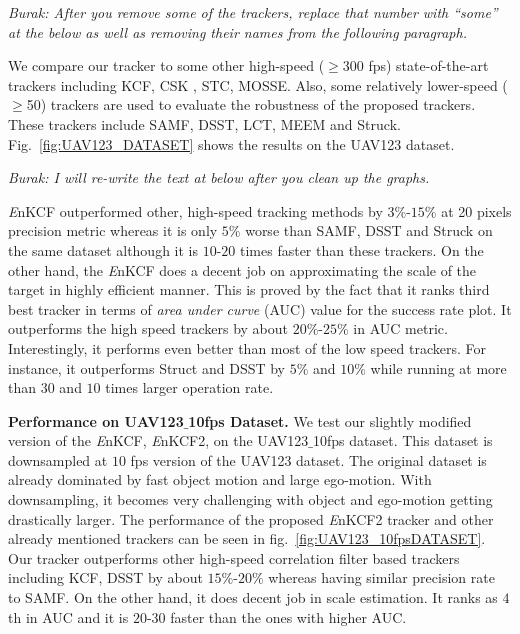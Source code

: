 \documentclass{bmvc2k}
\begin{document}
{\it Burak: After you remove some of the trackers, replace that number
  with ``some'' at the below as well as removing their names from the
  following paragraph.}

We compare our tracker to some other high-speed ($\geq$300 fps)
state-of-the-art trackers including KCF\cite{henriques2015high}, CSK
\cite{henriques2012exploiting}, STC\cite{zhang2014fast},
MOSSE\cite{bolme2010visual,henriques2015high}. Also, some relatively
lower-speed ($\geq$50) trackers are used to evaluate the robustness of
the proposed trackers. These trackers include SAMF\cite{li2014scale},
DSST\cite{danelljan2014accurate}, LCT\cite{ma2015long},
MEEM\cite{zhang2014meem} and Struck\cite{hare2012efficient}.
Fig.~\ref{fig:UAV123_DATASET} shows the results on the UAV123
dataset. 

{\it Burak: I will re-write the text at below after you clean up the graphs.}

{\it E}nKCF outperformed other, high-speed tracking methods by
$3\%$-$15\%$ at 20 pixels precision metric whereas it is only $5\%$
worse than SAMF, DSST and Struck on the same dataset although it is
$10$-$20$ times faster than these trackers. On the other hand, the
{\it E}nKCF does a decent job on approximating the scale of the target
in highly efficient manner. This is proved by the fact that it ranks
third best tracker in terms of \textit{area under curve} (AUC) value
for the success rate plot. It outperforms the high speed trackers by
about $20\%$-$25\%$ in AUC metric. Interestingly, it performs even
better than most of the low speed trackers. For instance, it
outperforms Struct and DSST by $5\%$ and $10\%$ while running at more
than $30$ and $10$ times larger operation rate.

\textbf{Performance on UAV123$\_$10fps Dataset.} We test our
slightly modified version of the {\it E}nKCF, {\it E}nKCF2, on the
UAV123$\_$10fps dataset. This dataset is downsampled at $10$ fps
version of the UAV123 dataset. The original dataset is already
dominated by fast object motion and large ego-motion. With
downsampling, it becomes very challenging with object and ego-motion
getting drastically larger. The performance of the proposed {\it
  E}nKCF2 tracker and other already mentioned trackers can be seen in
fig.~\ref{fig:UAV123_10fpsDATASET}. Our tracker outperforms other
high-speed correlation filter based trackers including KCF, DSST by
about $15\%$-$20\%$ whereas having similar precision rate to SAMF. On
the other hand, it does decent job in scale estimation. It ranks as
$4$th in AUC and it is $20$-$30$ faster than the ones with
higher AUC.
\end{document}
